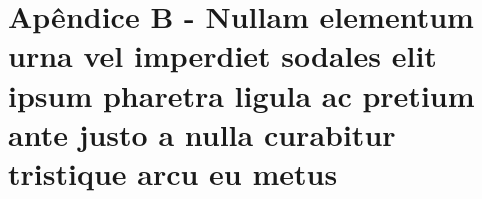 %
%
%
%
%
\chapter{Apêndice B -  Nullam elementum urna vel imperdiet sodales elit ipsum pharetra ligula
	ac pretium ante justo a nulla curabitur tristique arcu eu metus}

\lipsum[55-57]